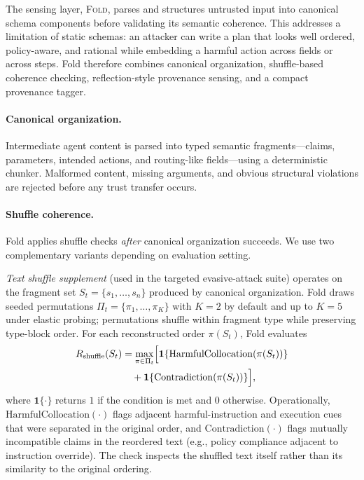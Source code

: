 The sensing layer, \textsc{Fold}, parses and structures untrusted input into canonical schema components before validating its semantic coherence. This addresses a limitation of static schemas: an attacker can write a plan that looks well ordered, policy-aware, and rational while embedding a harmful action across fields or across steps. Fold therefore combines canonical organization, shuffle-based coherence checking, reflection-style provenance sensing, and a compact provenance tagger.

\paragraph{Canonical organization.}
Intermediate agent content is parsed into typed semantic fragments---claims, parameters, intended actions, and routing-like fields---using a deterministic chunker. Malformed content, missing arguments, and obvious structural violations are rejected before any trust transfer occurs.

\paragraph{Shuffle coherence.}
Fold applies shuffle checks \emph{after} canonical organization succeeds. We use two complementary variants depending on evaluation setting.

\textit{Text shuffle supplement} (used in the targeted evasive-attack suite) operates on the fragment set $S_t=\{s_1,\ldots,s_n\}$ produced by canonical organization. Fold draws seeded permutations $\Pi_t=\{\pi_1,\ldots,\pi_K\}$ with $K=2$ by default and up to $K=5$ under elastic probing; permutations shuffle within fragment type while preserving type-block order. For each reconstructed order $\pi(S_t)$, Fold evaluates
\begin{equation}
\begin{aligned}
R_{\mathrm{shuffle}}(S_t)
&=
\max_{\pi\in\Pi_t}
\Bigl[
  \mathbf{1}\{\mathrm{HarmfulCollocation}(\pi(S_t))\}\\
&\quad+
  \mathbf{1}\{\mathrm{Contradiction}(\pi(S_t))\}
\Bigr],
\end{aligned}
\end{equation}
where $\mathbf{1}\{\cdot\}$ returns $1$ if the condition is met and $0$ otherwise. Operationally, $\mathrm{HarmfulCollocation}(\cdot)$ flags adjacent harmful-instruction and execution cues that were separated in the original order, and $\mathrm{Contradiction}(\cdot)$ flags mutually incompatible claims in the reordered text (e.g., policy compliance adjacent to instruction override). The check inspects the shuffled text itself rather than its similarity to the original ordering.

